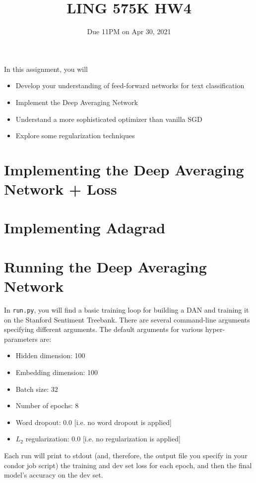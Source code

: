 \documentclass[11pt]{article}
\begin{document}
\title{LING 575K HW4}
\date{\vspace{-0.2in}Due 11PM on Apr 30, 2021}
\maketitle


\noindent In this assignment, you will 
\begin{itemize}
  \item Develop your understanding of feed-forward networks for text classification
  \item Implement the Deep Averaging Network
  \item Understand a more sophisticated optimizer than vanilla SGD
  \item Explore some regularization techniques
\end{itemize}


\section{Implementing the Deep Averaging Network + Loss}



\section{Implementing Adagrad}

\section{Running the Deep Averaging Network}

In \texttt{run.py}, you will find a basic training loop for building a DAN and training it on the Stanford Sentiment Treebank.  There are several command-line arguments specifying different arguments.  The default arguments for various hyper-parameters are:
\begin{itemize}
  \item Hidden dimension: 100
  \item Embedding dimension: 100
  \item Batch size: 32
  \item Number of epochs: 8
  \item Word dropout: 0.0 [i.e. no word dropout is applied]
  \item $L_2$ regularization: 0.0 [i.e. no regularization is applied]
\end{itemize}
Each run will print to stdout (and, therefore, the output file you specify in your condor job script) the training and dev set loss for each epoch, and then the final model's accuracy on the dev set.
\end{document}
